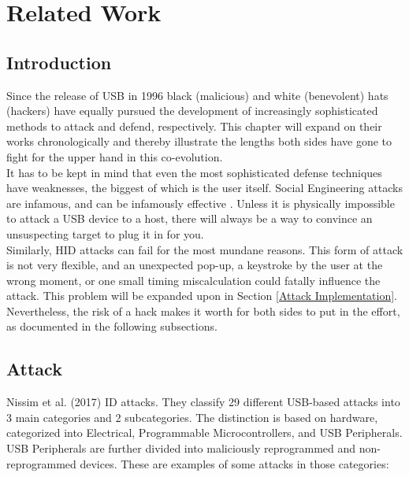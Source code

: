 \chapter{Related Work}

\section{Introduction}

Since the release of USB in 1996 \cite{WaybackMachine2018} black (malicious) and white (benevolent) hats (hackers) have equally pursued the development of increasingly sophisticated methods to attack and defend, respectively. This chapter will expand on their works chronologically and thereby illustrate the lengths both sides have gone to fight for the upper hand in this co-evolution.\\
It has to be kept in mind that even the most sophisticated defense techniques have weaknesses, the biggest of which is the user itself. Social Engineering attacks are infamous, and can be infamously effective \cite{krombholzAdvancedSocialEngineering2015}. Unless it is physically impossible to attack a USB device to a host, there will always be a way to convince an unsuspecting target to plug it in for you.\\ 
Similarly, HID attacks can fail for the most mundane reasons. This form of attack is not very flexible, and an unexpected pop-up, a keystroke by the user at the wrong moment, or one small timing miscalculation could fatally influence the attack. This problem will be expanded upon in Section \ref{Attack Implementation}.\\
Nevertheless, the risk of a hack makes it worth for both sides to put in the effort, as documented in the following subsections.

\section{Attack}

Nissim et al. (2017) \cite{nissimUSBbasedAttacks2017} ID attacks. They classify 29 different USB-based attacks into 3 main categories and 2 subcategories. The distinction is based on hardware, categorized into Electrical, Programmable Microcontrollers, and USB Peripherals. USB Peripherals are further divided into maliciously reprogrammed and non-reprogrammed devices. These are examples of some attacks in those categories:

